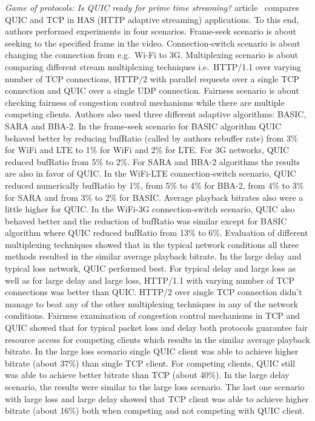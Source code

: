 \textit{Game of protocols: Is QUIC ready for prime time streaming?} article~\cite{game-of-protocols} compares QUIC and TCP in HAS (HTTP adaptive streaming) applications.
To this end, authors performed experiments in four scenarios.
Frame-seek scenario is about seeking to the specified frame in the video.
Connection-switch scenario is about changing the connection from e.g.\ Wi-Fi to 3G\@.
Multiplexing scenario is about comparing different stream multiplexing techniques i.e.\ HTTP/1.1 over varying number of TCP connections, HTTP/2 with parallel requests over a single TCP connection and QUIC over a single UDP connection.
Fairness scenario is about checking fairness of congestion control mechanisms while there are multiple competing clients.
Authors also used three different adaptive algorithms: BASIC, SARA and BBA-2.
In the frame-seek scenario for BASIC algorithm QUIC behaved better by reducing bufRatio (called by authors rebuffer rate) from 3\% for WiFi and LTE to 1\% for WiFi and 2\% for LTE\@.
For 3G networks, QUIC reduced bufRatio from 5\% to 2\%.
For SARA and BBA-2 algorithms the results are also in favor of QUIC\@.
In the WiFi-LTE connection-switch scenario, QUIC reduced numerically bufRatio by 1\%, from 5\% to 4\% for BBA-2, from 4\% to 3\% for SARA and from 3\% to 2\% for BASIC\@.
Average playback bitrates also were a little higher for QUIC\@.
In the WiFi-3G connection-switch scenario, QUIC also behaved better and the reduction of bufRatio was similar except for BASIC algorithm where QUIC reduced bufRatio from 13\% to 6\%.
Evaluation of different multiplexing techniques showed that in the typical network conditions all three methods resulted in the similar average playback bitrate.
In the large delay and typical loss network, QUIC performed best.
For typical delay and large loss as well as for large delay and large loss, HTTP/1.1 with varying number of TCP connections was better than QUIC\@.
HTTP/2 over single TCP connection didn't manage to beat any of the other multiplexing techniques in any of the network conditions.
Fairness examination of congestion control mechanisms in TCP and QUIC showed that for typical packet loss and delay both protocols guarantee fair resource access for competing clients which results in the similar average playback bitrate.
In the large loss scenario single QUIC client was able to achieve higher bitrate (about 37\%) than single TCP client.
For competing clients, QUIC still was able to achieve better bitrate than TCP (about 40\%).
In the large delay scenario, the results were similar to the large loss scenario.
The last one scenario with large loss and large delay showed that TCP client was able to achieve higher bitrate (about 16\%) both when competing and not competing with QUIC client.
